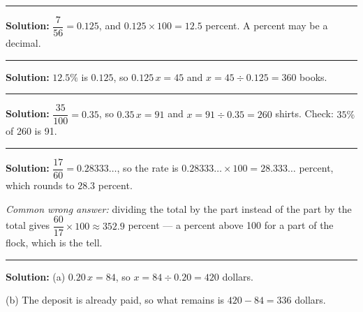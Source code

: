 \documentclass[12pt]{article}
\begin{document}
\vspace{0.25cm}\noindent\rule{\linewidth}{0.2pt}\vspace{0.25cm}


\textbf{Solution:} $\dfrac{7}{56} = 0.125$, and $0.125 \times 100 = 12.5$
percent. A percent may be a decimal. 

\vspace{0.25cm}\noindent\rule{\linewidth}{0.2pt}\vspace{0.25cm}


\textbf{Solution:} $12.5\%$ is $0.125$, so $0.125\,x = 45$ and
$x = 45 \div 0.125 = 360$ books. 

\vspace{0.25cm}\noindent\rule{\linewidth}{0.2pt}\vspace{0.25cm}


\textbf{Solution:} $\dfrac{35}{100} = 0.35$, so $0.35\,x = 91$ and
$x = 91 \div 0.35 = 260$ shirts. Check: $35\%$ of 260 is 91. 

\vspace{0.25cm}\noindent\rule{\linewidth}{0.2pt}\vspace{0.25cm}


\textbf{Solution:} $\dfrac{17}{60} = 0.28333\ldots$, so the rate is
$0.28333\ldots \times 100 = 28.333\ldots$ percent, which rounds to $28.3$
percent. 

\textit{Common wrong answer:} dividing the total by the part instead of the part
by the total gives $\dfrac{60}{17} \times 100 \approx 352.9$ percent --- a
percent above 100 for a part of the flock, which is the tell.

\vspace{0.25cm}\noindent\rule{\linewidth}{0.2pt}\vspace{0.25cm}


\textbf{Solution:} (a) $0.20\,x = 84$, so $x = 84 \div 0.20 = 420$
dollars. 

(b) The deposit is already paid, so what remains is
$420 - 84 = 336$ dollars. 
\end{document}
